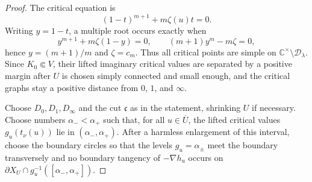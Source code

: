 \documentclass[reqno]{article}
\theoremstyle{definition}
\theoremstyle{remark}
\theoremstyle{plain}
\newcommand{\C}{\mathbb C}
\begin{document}
\begin{proof}
The critical equation is
\[
(1-t)^{m+1}+m\zeta(u)t=0.
\]
Writing \(y=1-t\), a multiple root occurs exactly when
\[
y^{m+1}+m\zeta(1-y)=0,\qquad (m+1)y^m-m\zeta=0,
\]
hence \(y=(m+1)/m\) and \(\zeta=c_m\). Thus all critical points are simple on \(\C^\times\setminus\mathcal D_\lambda\). Since \(K_0\Subset V\), their lifted imaginary critical values are separated by a positive margin after \(U\) is chosen simply connected and small enough, and the critical graphs stay a positive distance from \(0\), \(1\), and \(\infty\).

Choose \(D_0,D_1,D_\infty\) and the cut \(\mathfrak c\) as in the statement, shrinking \(U\) if necessary. Choose numbers \(\alpha_-<\alpha_+\) such that, for all \(u\in\overline U\), the lifted critical values \(g_u(t_\nu(u))\) lie in \((\alpha_-,\alpha_+)\). After a harmless enlargement of this interval, choose the boundary circles so that the levels \(g_u=\alpha_\pm\) meet the boundary transversely and no boundary tangency of \(-\nabla h_u\) occurs on \(\partial X_U\cap g_u^{-1}([\alpha_-,\alpha_+])\).


\end{proof}
\end{document}
